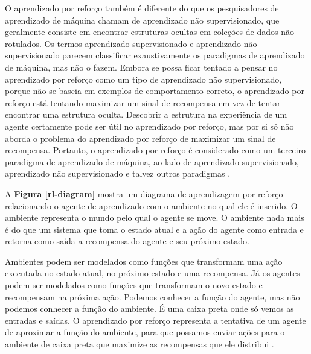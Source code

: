  O aprendizado por reforço também é diferente do que os pesquisadores de aprendizado de máquina chamam de aprendizado não supervisionado, que geralmente consiste em encontrar estruturas ocultas em coleções de dados não rotulados. Os termos aprendizado supervisionado e aprendizado não supervisionado parecem classificar exaustivamente os paradigmas de aprendizado de máquina, mas não o fazem. Embora se possa ficar tentado a pensar no aprendizado por reforço como um tipo de aprendizado não supervisionado, porque não se baseia em exemplos de comportamento correto, o aprendizado por reforço está tentando maximizar um sinal de recompensa em vez de tentar encontrar uma estrutura oculta. Descobrir a estrutura na experiência de um agente certamente pode ser útil no aprendizado por reforço, mas por si só não aborda o problema do aprendizado por reforço de maximizar um sinal de recompensa. Portanto, o aprendizado por reforço é considerado como um terceiro paradigma de aprendizado de máquina, ao lado de aprendizado supervisionado, aprendizado não supervisionado e talvez outros paradigmas  \cite{reinforcement-learning-intro-2018}.

 A \textbf{Figura \ref{rl-diagram}} mostra um diagrama de aprendizagem por reforço relacionando o agente de aprendizado com o ambiente no qual ele é inserido.
 O ambiente representa o mundo pelo qual o agente se move. O ambiente nada mais é do que um sistema que toma o estado atual e a ação do agente como entrada e retorna como saída a recompensa do agente e seu próximo estado. 

 Ambientes podem ser modelados como funções que transformam uma ação executada no estado atual, no próximo estado e uma recompensa. Já os agentes podem ser modelados como funções que transformam o novo estado e recompensam na próxima ação. 
 Podemos conhecer a função do agente, mas não podemos conhecer a função do ambiente. É uma caixa preta onde só vemos as entradas e saídas. 
 O aprendizado por reforço representa a tentativa de um agente de aproximar a função do ambiente, para que possamos enviar ações para o ambiente de caixa preta que maximize as recompensas que ele distribui \cite{beg-guide-rl}.


